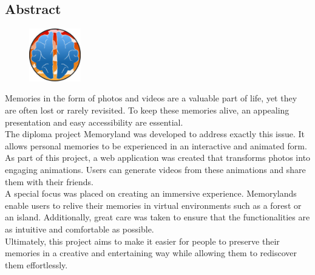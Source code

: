 \begin{spacing}{1}
    \chapter*{Abstract}
\end{spacing}
\begin{figure}
    \begin{center}
      \includegraphics[width=0.2\textwidth]{pics/memoryland-logo.png}
    \end{center}
\end{figure}

Memories in the form of photos and videos are a valuable part of life, yet they are often 
lost or rarely revisited. To keep these memories alive, an appealing presentation and easy 
accessibility are essential.
\\
The diploma project Memoryland was developed to address exactly this issue. It allows 
personal memories to be experienced in an interactive and animated form. As part of 
this project, a web application was created that transforms photos into engaging 
animations. Users can generate videos from these animations and share them with their friends.
\\
A special focus was placed on creating an immersive experience. Memorylands enable 
users to relive their memories in virtual environments such as a forest or an island. 
Additionally, great care was taken to ensure that the functionalities are as intuitive
and comfortable as possible.
\\
Ultimately, this project aims to make it easier for people to preserve their memories 
in a creative and entertaining way while allowing them to rediscover them effortlessly.

